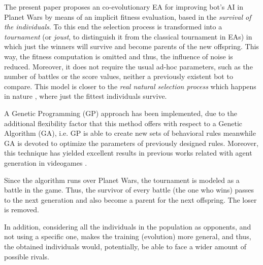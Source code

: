 \documentclass[conference]{IEEEtran}
\begin{document}
The present paper proposes an co-evolutionary EA \cite{EAs_Back96} for improving bot's AI in Planet Wars by means of an implicit fitness evaluation,
based in the \textit{survival of the individuals}.
To this end the selection process is transformed into a \textit{tournament} (or \textit{joust}, to distinguish it from the classical tournament in EAs) in which just the winners will survive and become parents of the new offspring. This way, the fitness computation is omitted and thus, the influence of noise is reduced.  Moreover, it does not require the usual ad-hoc parameters, such as the number of battles or the score values, neither a previously existent bot to compare.
This model is closer to the \textit{real natural selection process} which happens in nature \cite{darwin1859}, where just the fittest individuals survive.

A Genetic Programming (GP) \cite{GP_Koza92} approach has been implemented, due to the additional flexibility factor that this method offers with respect to a Genetic Algorithm (GA), i.e. GP is able to create new sets of behavioral rules meanwhile GA is devoted to optimize the parameters of previously designed rules. Moreover, this technique has yielded excellent results in previous works related with agent generation in videogames \cite{GarciaGP14,EsparciaGP2013}.


Since the algorithm runs over Planet Wars, the tournament is modeled as a battle in the game. %
Thus, the survivor of every battle (the one who wins)
passes to the next generation and also become a parent for the next
offspring. The loser is removed.


In addition,  considering all the individuals in the population as opponents, and not using a specific one, makes the training (evolution) more
general, and thus, the obtained individuals would, potentially, be able to face a wider amount of possible rivals.
\end{document}
